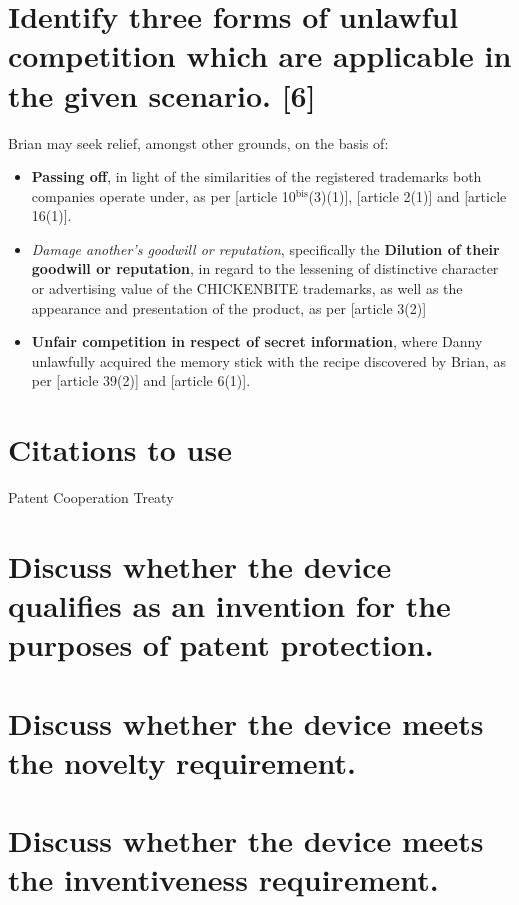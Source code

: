 \documentclass[11pt]{article}
\begin{document}
\section{Identify three forms of unlawful competition which are applicable in the given scenario. [6]}
\label{sec:orge6d1c02}
Brian may seek relief, amongst other grounds, on the basis of:
\begin{itemize}
\item \textbf{Passing off}, in light of the similarities of the registered trademarks both companies operate under, as per [article
10\(^{\text{bis}}\)(3)(1)]\cite{wipo83_paris_conve_protect_ip}, [article
2(1)]\cite{wipo96_model_provi_unfair_comp} and [article 16(1)]\cite{wto17_trips}.
\item \emph{Damage another's goodwill or reputation}, specifically the \textbf{Dilution of their
goodwill or reputation}, in regard to the lessening of distinctive character
or advertising value of the CHICKENBITE trademarks, as well as the appearance and
presentation of the product, as per [article 3(2)]\cite{wipo96_model_provi_unfair_comp}
\item \textbf{Unfair competition in respect of secret information}, where Danny unlawfully
acquired the memory stick with the recipe discovered by Brian, as per
[article 39(2)]\cite{wto17_trips} and [article 6(1)]\cite{wipo96_model_provi_unfair_comp}.
\end{itemize}
\section{Citations to use}
\label{sec:orge1f3395}
\cite{wto17_trips,wipo83_paris_conve_protect_ip}

Patent Cooperation Treaty \cite{wipo70_pct}

\section{Discuss whether the device qualifies as an invention for the purposes of patent protection.}
\label{sec:org884de8c}
\section{Discuss whether the device meets the novelty requirement.}
\label{sec:org64bc3a7}
\section{Discuss whether the device meets the inventiveness requirement.}
\label{sec:org290b156}

\printbibliography
\end{document}
